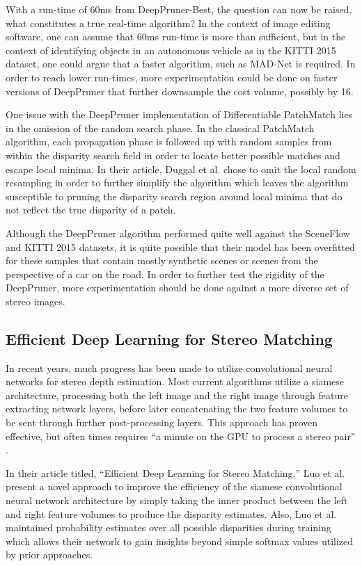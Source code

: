 \documentclass{article}
\begin{document}
With a run-time of 60ms from DeepPruner-Best, the question can now be raised, what constitutes a true real-time algorithm? In the context of image editing software, one can assume that 60ms run-time is more than sufficient, but in the context of identifying objects in an autonomous vehicle as in the KITTI 2015 dataset, one could argue that a faster algorithm, such as MAD-Net is required. In order to reach lower run-times, more experimentation could be done on faster versions of DeepPruner that further downsample the cost volume, possibly by 16.

One issue with the DeepPruner implementation of Differentiable PatchMatch lies in the omission of the random search phase. In the classical PatchMatch algorithm, each propagation phase is followed up with random samples from within the disparity search field in order to locate better possible matches and escape local minima. In their article, Duggal et al. \citep{duggal2019deeppruner} chose to omit the local random resampling in order to further simplify the algorithm which leaves the algorithm susceptible to pruning the disparity search region around local minima that do not reflect the true disparity of a patch.

Although the DeepPruner algorithm \citep{duggal2019deeppruner} performed quite well against the SceneFlow and KITTI 2015 datasets, it is quite possible that their model has been overfitted for these samples that contain mostly synthetic scenes or scenes from the perspective of a car on the road. In order to further test the rigidity of the DeepPruner, more experimentation should be done against a more diverse set of stereo images.

\subsection{Efficient Deep Learning for Stereo Matching}
In recent years, much progress has been made to utilize convolutional neural networks for stereo depth estimation. Most current algorithms utilize a siamese architecture, processing both the left image and the right image through feature extracting network layers, before later concatenating the two feature volumes to be sent through further post-processing layers. This approach has proven effective, but often times requires “a minute on the GPU to process a stereo pair” \citep{luo2016efficient}.

In their article titled, “Efficient Deep Learning for Stereo Matching,” Luo et al. \citep{luo2016efficient} present a novel approach to improve the efficiency of the siamese convolutional neural network architecture by simply taking the inner product between the left and right feature volumes to produce the disparity estimates. Also, Luo et al. \citep{luo2016efficient} maintained probability estimates over all possible disparities during training which allows their network to gain insights beyond simple softmax values utilized by prior approaches.
\end{document}
